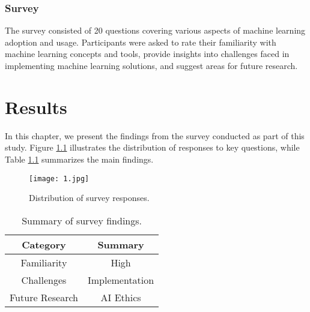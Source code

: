 \documentclass{report}
\begin{document}
\subsection{Survey}
The survey consisted of 20 questions covering various aspects of machine learning adoption and usage. Participants were asked to rate their familiarity with machine learning concepts and tools, provide insights into challenges faced in implementing machine learning solutions, and suggest areas for future research.

\chapter{Results}

In this chapter, we present the findings from the survey conducted as part of this study. Figure \ref{fig:example} illustrates the distribution of responses to key questions, while Table \ref{tab:summary} summarizes the main findings.

\begin{figure}[h]
  \centering
  \texttt{[image: 1.jpg]}
  \caption{Distribution of survey responses.}
  \label{fig:example}
\end{figure}

\begin{table}[h]
  \centering
  \begin{tabular}{|c|c|}
    \hline
    \textbf{Category} & \textbf{Summary} \\
    \hline
    Familiarity & High \\
    Challenges & Implementation \\
    Future Research & AI Ethics \\
    \hline
  \end{tabular}
  \caption{Summary of survey findings.}
  \label{tab:summary}
\end{table}



\end{document}
